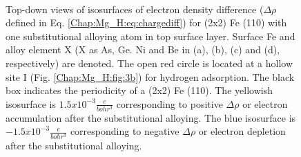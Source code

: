 \begingroup
\begin{figure}[!ht]
  \centering
  \label{Chap:Mg_H:fig:9a}
  \label{Chap:Mg_H:fig:9b}
  \\
  \label{Chap:Mg_H:fig:9c}
  \label{Chap:Mg_H:fig:9d}  
\caption[Top-down views of isosurfaces of electron density difference for (2x2) Fe (110) with one substitutional alloying atom in top surface layer]{Top-down views of isosurfaces of electron density difference ($\Delta \rho$ defined in Eq. \ref{Chap:Mg_H:eq:chargediff}) for (2x2) Fe (110) with one substitutional alloying atom in top surface layer. Surface Fe and alloy element X (X as As, Ge. Ni and Be in (a), (b), (c) and (d), respectively) are denoted. The open red circle is located at a hollow site I (Fig. \ref{Chap:Mg_H:fig:3b}) for hydrogen adsorption. The black box indicates the periodicity of a (2x2) Fe (110). The yellowish isosurface is $1.5x10^{-3}\frac{e}{bohr^3}$ corresponding to positive $\Delta \rho$ or electron accumulation after the substitutional alloying. The blue isosurface is $-1.5x10^{-3}\frac{e}{bohr^3}$ corresponding to negative $\Delta \rho$ or electron depletion after the substitutional alloying.}
  \label{Chap:Mg_H:fig9}
\end{figure}
